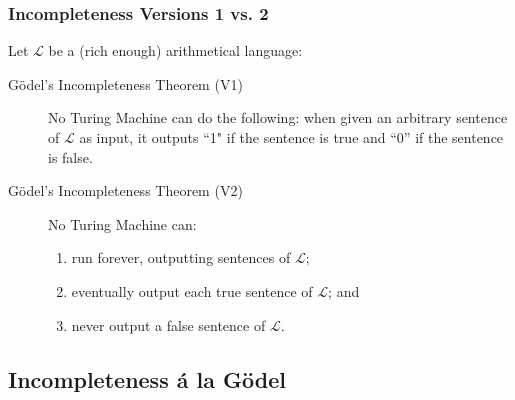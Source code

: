 \begin{frame}
\frametitle{Incompleteness Versions 1 vs. 2}

Let $\mathcal{L}$ be a (rich enough) arithmetical language:


\begin{description}
\item[G\"odel's Incompleteness Theorem (V1)]   No Turing Machine can do the following: when given an arbitrary sentence of $\mathcal{L}$ as input, it outputs ``1" if the sentence is true and ``0'' if the sentence is false. 


\pause

\item[G\"odel's Incompleteness Theorem (V2)] No Turing Machine can:
\begin{enumerate}[<+->]
\item run forever, outputting sentences of $\mathcal{L}$;
\item eventually output each true sentence of $\mathcal{L}$; and
\item never output a false sentence of $\mathcal{L}$.
\end{enumerate}



\end{description}
\end{frame}















\subsection{Incompleteness \'a la G\"odel}

